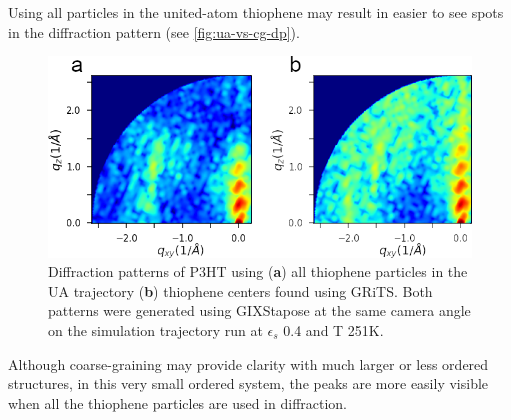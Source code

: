 Using all particles in the united-atom thiophene may result in easier to see spots in the diffraction pattern (see \autoref{fig:ua-vs-cg-dp}).
\begin{figure}
    \centering
    \includegraphics[width=0.8\linewidth]{figures/p3ht_val/ua_vs_cg_dp.png}
    \caption{Diffraction patterns of P3HT using (\textbf{a}) all thiophene particles in the UA trajectory (\textbf{b}) thiophene centers found using GRiTS. Both patterns were generated using GIXStapose at the same camera angle on the simulation trajectory run at $\epsilon_{s}$ 0.4 and T 251K.}\label{fig:ua-vs-cg-dp}
\end{figure}
Although coarse-graining may provide clarity with much larger or less ordered structures, in this very small ordered system, the peaks are more easily visible when all the thiophene particles are used in diffraction.


